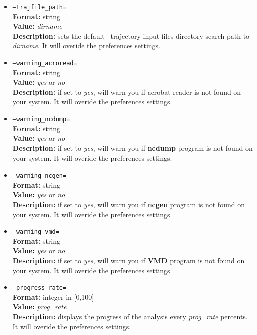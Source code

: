 \documentclass[a4paper,11pt]{report}
\begin{document}
\begin{itemize}
\item{\texttt {--trajfile\_path=}}\\
\textbf{Format:} string\\
\textbf{Value:} \textit{dirname}\\
\textbf{Description:} sets the default \MMTK\ trajectory input files directory search path to \textit{dirname}. It will 
overide the preferences settings.

\item{\texttt {--warning\_acroread=}}\\
\textbf{Format:} string\\
\textbf{Value:} \textit{yes} or \textit{no}\\
\textbf{Description:} if set to \textit{yes}, will warn you if acrobat reader is not found on your system. It will 
overide the preferences settings.

\item{\texttt {--warning\_ncdump=}}\\
\textbf{Format:} string\\
\textbf{Value:} \textit{yes} or \textit{no}\\
\textbf{Description:} if set to \textit{yes}, will warn you if \textbf{ncdump} program is not found on your system. It will 
overide the preferences settings.

\item{\texttt {--warning\_ncgen=}}\\
\textbf{Format:} string\\
\textbf{Value:} \textit{yes} or \textit{no}\\
\textbf{Description:} if set to \textit{yes}, will warn you if \textbf{ncgen} program is not found on your system. It will 
overide the preferences settings.

\item{\texttt {--warning\_vmd=}}\\
\textbf{Format:} string\\
\textbf{Value:} \textit{yes} or \textit{no}\\
\textbf{Description:} if set to \textit{yes}, will warn you if \textbf{VMD} program is not found on your system. It will 
overide the preferences settings.

\item{\texttt {--progress\_rate=}}\\
\textbf{Format:} integer in [0,100]\\
\textbf{Value:} \textit{prog\_rate}\\
\textbf{Description:} displays the progress of the analysis every \textit{prog\_rate} percents. It will overide the 
preferences settings.
\end{itemize}
\end{document}
